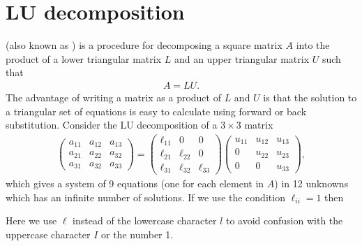 \documentclass[letterpaper,10pt,english]{jupyterBook}
\begin{document}
\sphinxstepscope


\section{LU decomposition}
\label{\detokenize{6_Direct_methods/6.1_LU_decomposition:lu-decomposition}}\label{\detokenize{6_Direct_methods/6.1_LU_decomposition:lu-section}}\label{\detokenize{6_Direct_methods/6.1_LU_decomposition::doc}}
\sphinxAtStartPar
{} (also known as ) is a procedure for decomposing a square matrix \(A\) into the product of a lower triangular matrix \(L\) and an upper triangular matrix \(U\) such that
\begin{align*}
    A = LU.
\end{align*}
\sphinxAtStartPar
The advantage of writing a matrix as a product of \(L\) and \(U\) is that the solution to a triangular set of equations is easy to calculate using forward or back substitution. Consider the LU decomposition of a \(3\times 3\) matrix
\begin{align*}
    \begin{pmatrix}
        a_{11}  & a_{12}  & a_{13} \\
        a_{21}  & a_{22}  & a_{32} \\
        a_{31}  & a_{32}  & a_{33} 
    \end{pmatrix}=
    \begin{pmatrix}
        \ell_{11}  & 0 & 0\\
        \ell_{21}  & \ell_{22}  & 0\\
        \ell_{31}  & \ell_{32}  & \ell_{33} 
    \end{pmatrix}\begin{pmatrix}
        u_{11}  & u_{12}  & u_{13} \\
        0 & u_{22}  & u_{23} \\
        0 & 0 & u_{33} 
    \end{pmatrix},
\end{align*}
\sphinxAtStartPar
which gives a system of 9 equations (one for each element in \(A\)) in 12 unknowns which has an infinite number of solutions. If we use the condition \(\ell_{ii} = 1\) then%
\begin{footnote}[1]\sphinxAtStartFootnote
Here we use \(\ell\) instead of the lowercase character \(l\) to avoid confusion with the uppercase character \(I\) or the number 1.
%
\end{footnote}
\end{document}
